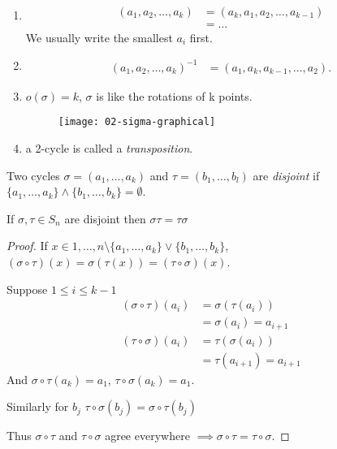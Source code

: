 \begin{remark} ~
\begin{enumerate}
\def\labelenumi{\roman{enumi}.}
\item
  \begin{align*}
   (a_1, a_2, \ldots, a_k) &= (a_k, a_1, a_2, \ldots, a_{k-1}) \\
   &= \ldots
  \end{align*} We usually write the smallest $a_i$ first.
\item
  \begin{align*}
  (a_1, a_2, \ldots, a_k)^{-1} &= (a_1, a_k, a_{k-1}, \ldots, a_2).
  \end{align*}
\item
  $o(\sigma) = k$, $\sigma$ is like the rotations of k points.
  \begin{figure}
    \centering \texttt{[image: 02-sigma-graphical]}
  \end{figure} 
\item
  a 2-cycle is called a \emph{transposition}.
\end{enumerate}

\end{remark}

\begin{definition}
Two cycles $\sigma = (a_1, \ldots, a_k)$ and $\tau = (b_1, \ldots, b_l)$ are \emph{disjoint} if $\{ a_1, \ldots, a_k \} \land \{ b_1, \ldots, b_k \} = \emptyset$.
\end{definition}

\begin{lemma}
\protect\hypertarget{lem:six}{}\label{lem:six}
If $\sigma, \tau \in S_n$ are disjoint then $\sigma \tau = \tau \sigma$
\end{lemma}

\begin{proof}
If $x \in {1, \ldots, n} \setminus \{ a_1, \ldots, a_k \} \lor \{ b_1, \ldots, b_k \}$, $(\sigma \circ \tau) (x) = \sigma \left( \tau(x) \right) = (\tau \circ \sigma)(x)$.

Suppose $1 \leq i \leq k - 1$
\begin{align*}
    (\sigma \circ \tau)(a_i) &= \sigma\left(\tau(a_i) \right) \\
    &= \sigma(a_i) = a_{i + 1} \\
    (\tau \circ \sigma)(a_i) &= \tau\left(\sigma(a_i) \right) \\
    &= \tau(a_{i + 1}) = a_{i + 1}
\end{align*}
And $\sigma \circ \tau (a_k) = a_1$, $\tau \circ \sigma (a_k) = a_1$.

Similarly for $b_j$
$\tau \circ \sigma (b_j) = \sigma \circ \tau (b_j)$

Thus $\sigma \circ \tau$ and $\tau \circ \sigma$ agree everywhere $\implies \sigma \circ \tau = \tau \circ \sigma$.
\end{proof}

